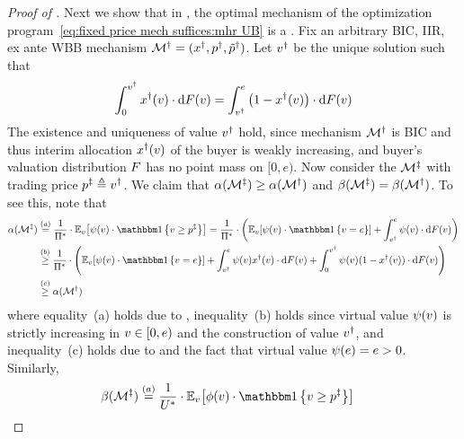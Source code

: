 \begin{proof}[Proof of ]
Next we show that in , the optimal mechanism of the optimization program~\eqref{eq:fixed price mech suffices:mhr UB} is a {\FixPrice}. Fix an arbitrary BIC, IIR, ex ante WBB mechanism $\mathcal{M}^\dagger = (x^\dagger,p^\dagger,\tilde{p}^\dagger)$. Let $v^\dagger$ be the unique solution such that
\begin{align*}
    \displaystyle\int_0^{v^\dagger} x^\dagger(v) \cdot \mathrm{d}F(v) 
    =
    \displaystyle\int_{v^\dagger}^{e} \left(1 - x^\dagger(v)\right)\cdot \mathrm{d}F(v)
\end{align*}
The existence and uniqueness of value $v^\dagger$ hold, since mechanism $\mathcal{M}^\dagger$ is BIC and thus interim allocation $x^\dagger(v)$ of the buyer is weakly increasing, and buyer's valuation distribution $F$ has no point mass on $[0, e)$. Now consider the {\FixPrice} $\mathcal{M}^\ddagger$ with trading price $p^\ddagger \triangleq v^\dagger$. We claim that $\alpha(\mathcal{M}^\ddagger) \geq \alpha(\mathcal{M}^\dagger)$ and $\beta(\mathcal{M}^\ddagger) = \beta(\mathcal{M}^\dagger)$.
To see this, note that 
\begin{align*}
    \revratio(\mech\doubleprimed) &\overset{(a)}{=} \frac{1}{\sellerbenchmark}\cdot \expect[\val]{\virtualval(\val)\cdot \indicator{\val\geq \price\doubleprimed}}
    =
    \frac{1}{\sellerbenchmark}\cdot 
    \left(\expect[\val]{\virtualval(\val)\cdot \indicator{\val=e}}
    +
    \displaystyle\int_{\val\primed}^{e} \virtualval(\val)\cdot \d\buyercdf(\val)
    \right)
    \\
    &\overset{(b)}{\geq}
    \frac{1}{\sellerbenchmark}\cdot 
    \left(\expect[\val]{\virtualval(\val)\cdot \indicator{\val= e}}
    +
    \displaystyle\int_{\val\primed}^{e} \virtualval(\val)\alloc\primed(\val)\cdot \d\buyercdf(\val)
    +
    \displaystyle\int_0^{\val\primed} \virtualval(\val)(1-\alloc\primed(\val))\cdot \d\buyercdf(\val)
    \right)
    \\
    &\overset{(c)}{\geq}
    \revratio(\mech\primed)
\end{align*}
where equality~(a) holds due to ,
inequality~(b) holds since virtual value $\psi(v)$ is strictly increasing in $v\in[0, e)$ and the construction of value $v^\dagger$,
and inequality~(c) holds due to  and the fact that virtual value $\psi(e) = e > 0$. Similarly,
\begin{align*}
    \residuesurplusratio(\mech\doubleprimed) &\overset{(a)}{=} \frac{1}{\buyerbenchmark}\cdot \expect[\val]{\buyerhazardrate(\val)\cdot \indicator{\val\geq \price\doubleprimed}}

\end{align*}
\end{proof}

